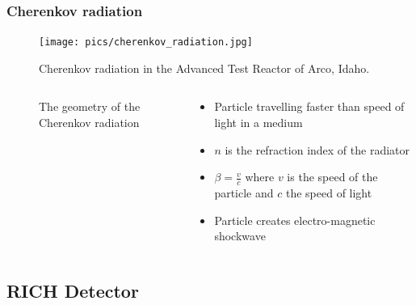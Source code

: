 \documentclass[10pt, xcolor={table}]{beamer}
\begin{document}
\begin{frame}[c,allowframebreaks]\frametitle{Cherenkov radiation}
    \begin{figure}
      \texttt{[image: pics/cherenkov\_radiation.jpg]}
      \caption{Cherenkov radiation in the Advanced Test Reactor of Arco, Idaho.}
    \end{figure}
\begin{columns}
  \begin{column}{0.5\textwidth}
    \begin{figure}[htbp]
  \centering
  \caption{The geometry of the Cherenkov radiation}
  \label{fig:label}
\end{figure}
  \end{column}
  \begin{column}{0.5\textwidth}

    \begin{itemize}
      \item Particle travelling faster than speed of light in a medium
      \item $n$ is the refraction index of the radiator
      \item $\beta = \frac{v}{c}$ where $v$ is the speed of the particle and $c$ the speed of light
      \item Particle creates electro-magnetic shockwave
    \end{itemize}
  \end{column}
\end{columns}

\end{frame}


\subsection{RICH Detector} %
\label{sec:rich_detector}
\end{document}
